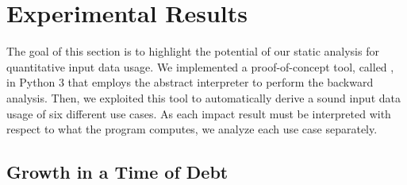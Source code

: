 \section{Experimental Results}
\newcommand*{\x}{\texttt{angle}}
\newcommand*{\y}{\texttt{speed}}
\newcommand*{\z}{\texttt{risk}}


The goal of this section is to highlight the potential of our static analysis for quantitative input data usage.
We implemented a proof-of-concept tool, called \impatto{}, in Python 3 that employs the \interproc{} abstract interpreter to perform the backward analysis.
Then, we exploited this tool to automatically derive a sound input data usage of six different use cases.
As each impact result must be interpreted with respect to what the program computes, we analyze each use case separately.

\subsection{Growth in a Time of Debt}


